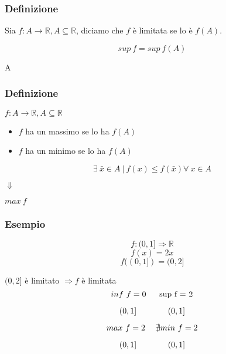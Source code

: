 \subsubsection*{Definizione}
Sia $f:A\rightarrow \mathbb{R}, A \subseteq \mathbb{R}$, diciamo che $f$ è limitata se lo è $f(A)$.
\begin{Large}
\[
    sup\ f = sup\ f(A)    
\]
\end{Large}
\vspace{-7.5ex}
\begin{center}
\begin{small}
    \hspace{0.7cm}A
\end{small}
\end{center}

\subsubsection*{Definizione}
$f:A \rightarrow \mathbb{R}, A \subseteq \mathbb{R}$
\begin{itemize}
    \item $f$ ha un massimo se lo ha $f(A)$
    \item $f$ ha un minimo se lo ha $f(A)$
\end{itemize}
\begin{Large}
    \[
        \exists\ \bar{x} \in A\ |\ f(x) \leq f(\bar{x}) \forall\ x \in A
    \]

\vspace{-3ex}
\begin{center}
    \hspace{2cm} $\Downarrow$
\end{center}
\vspace{-4ex}
\begin{center}
    \hspace{2cm} $max\ f$
\end{center}
\end{Large}
\subsubsection*{Esempio}
\[
    f:(0,1]\Rightarrow\mathbb{R}    
\]
\[
    f(x) = 2x    
\]
\[
    f((0,1]) = (0,2]    
\]

$(0,2]$ è limitato $\Rightarrow f$ è limitata
\[
    inf\ f = 0  \text{\hspace{3ex} sup\ f = 2}
\]
\vspace{-4.5ex}
\begin{small}
\[(0,1] \text{\hspace{9ex}} (0,1]\]
\end{small}
\[
    max\ f = 2  \text{\hspace{3ex}} \nexists min\ f = 2
\]
\vspace{-4ex}
\begin{small}
\[(0,1] \text{\hspace{9ex}} (0,1]\]
\end{small}

